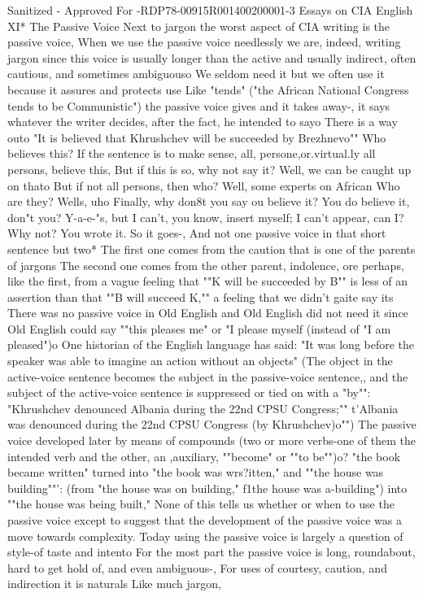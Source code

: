 \documentclass[
    oneside,
    11pt,
    draft
]{memoir}
\begin{document}
Sanitized - Approved For -RDP78-00915R001400200001-3 Essays on CIA English XI* The Passive Voice Next to jargon the worst aspect of CIA writing is the passive voice, When we use the passive voice needlessly we are, indeed, writing jargon since this voice is usually longer than the active and usually indirect, often cautious, and sometimes ambiguouso We seldom need it but we often use it because it assures and protects use Like "tends" ("the African National Congress tends to be Communistic") the passive voice gives and it takes away-, it says whatever the writer decides, after the fact, he intended to sayo There is a way outo "It is believed that Khrushchev will be succeeded by Brezhnevo"" Who believes this? If the sentence is to make sense, all, persone,or.virtual.ly all persons, believe this, But if this is so, why not say it? Well, we can be caught up on thato But if not all persons, then who? Well, some experts on African Who are they? Wells, uho Finally, why don8t you say ou believe it? You do believe it, don"t you? Y-a-e-"s, but I can't, you know, insert myself; I can't appear, can I? Why not? You wrote it. So it goes-, And not one passive voice in that short sentence but two* The first one comes from the caution that is one of the parents of jargons The second one comes from the other parent, indolence, ore perhaps, like the first, from a vague feeling that ""K will be succeeded by B"" is less of an assertion than that ""B will succeed K,"" a feeling that we didn't gaite say its There was no passive voice in Old English and Old English did not need it since Old English could say ""this pleases me" or "I please myself (instead of "I am pleased")o One historian of the English language has said: "It was long before the speaker was able to imagine an action without an objects" (The object in the active-voice sentence becomes the subject in the passive-voice sentence,, and the subject of the active-voice sentence is suppressed or tied on with a "by"": "Khrushchev denounced Albania during the 22nd CPSU Congress;"" t'Albania was denounced during the 22nd CPSU Congress (by Khrushchev)o"") The passive voice developed later by means of compounds (two or more verbs-one of them the intended verb and the other, an ,auxiliary, ""become" or ""to be"")o? "the book became written" turned into "the book was wrs?itten," and ""the house was building""': (from "the house was on building," f1the house was a-building") into ""the house was being built," None of this tells us whether or when to use the passive voice except to suggest that the development of the passive voice was a move towards complexity. Today using the passive voice is largely a question of style-of taste and intento For the most part the passive voice is long, roundabout, hard to get hold of, and even ambiguous-, For uses of courtesy, caution, and indirection it is naturals Like much jargon,
\end{document}
